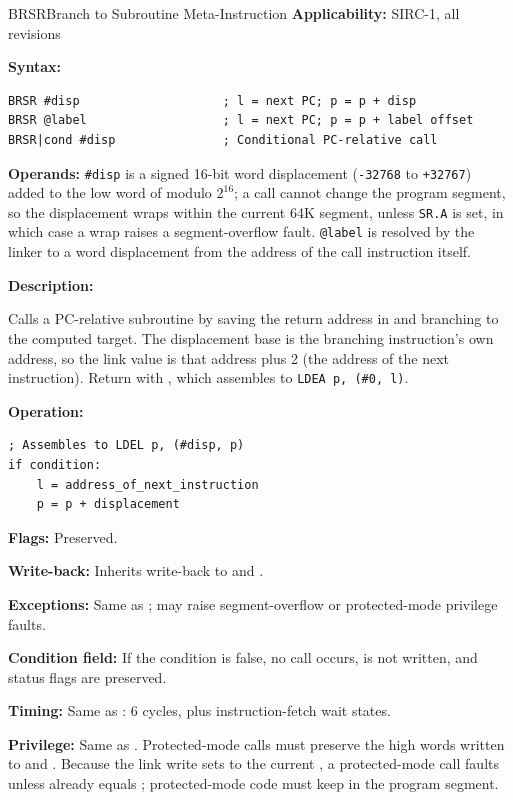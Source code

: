 \begin{instructionbox}{BRSR}{Branch to Subroutine Meta-Instruction}
	\textbf{Applicability:} SIRC-1, all revisions

	\textbf{Syntax:}
	\begin{lstlisting}
BRSR #disp                    ; l = next PC; p = p + disp
BRSR @label                   ; l = next PC; p = p + label offset
BRSR|cond #disp               ; Conditional PC-relative call
\end{lstlisting}

	\textbf{Operands:} \texttt{\#disp} is a signed 16-bit word displacement (\texttt{-32768} to \texttt{+32767}) added to
	the low word of  modulo $2^{16}$; a call cannot change the program segment, so the displacement wraps within the
	current 64K segment, unless \texttt{SR.A} is set, in which case a wrap raises a segment-overflow fault. \texttt{@label}
	is resolved by the linker to a word displacement from the address of the call instruction itself.

	\textbf{Description:}

	Calls a PC-relative subroutine by saving the return address in  and branching to the computed target. The
	displacement base is the branching instruction's own address, so the  link value is that address plus 2
	(the address of the next instruction). Return with , which assembles to \texttt{LDEA p, (\#0, l)}.

	\textbf{Operation:}
	\begin{verbatim}
; Assembles to LDEL p, (#disp, p)
if condition:
    l = address_of_next_instruction
    p = p + displacement
\end{verbatim}

	\textbf{Flags:} Preserved.

	\textbf{Write-back:} Inherits  write-back to  and .

	\textbf{Exceptions:} Same as ; may raise segment-overflow or protected-mode privilege faults.

	\textbf{Condition field:} If the condition is false, no call occurs,  is not written, and status flags are
	preserved.

	\textbf{Timing:} Same as : 6 cycles, plus instruction-fetch wait states.

	\textbf{Privilege:} Same as . Protected-mode calls must preserve the high words written to  and
	. Because the link write sets  to the current , a protected-mode call faults unless  already equals ; protected-mode code must keep  in the program segment.


\end{instructionbox}

